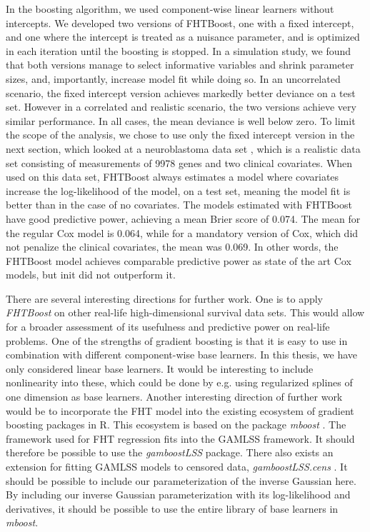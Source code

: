 In the boosting algorithm, we used component-wise linear learners without intercepts.
We developed two versions of FHTBoost, one with a fixed intercept, and one where the intercept is treated as a nuisance parameter, and is optimized in each iteration until the boosting is stopped.
In a simulation study, we found that both versions manage to select informative variables and shrink parameter sizes, and, importantly, increase model fit while doing so.
In an uncorrelated scenario, the fixed intercept version achieves markedly better deviance on a test set.
However in a correlated and realistic scenario, the two versions achieve very similar performance.
In all cases, the mean deviance is well below zero.
To limit the scope of the analysis, we chose to use only the fixed intercept version in the next section, which looked at a neuroblastoma data set \citep{oberthuer-data}, which is a realistic data set consisting of measurements of 9978 genes and two clinical covariates.
When used on this data set, FHTBoost always estimates a model where covariates increase the log-likelihood of the model, on a test set, meaning the model fit is better than in the case of no covariates.
The models estimated with FHTBoost have good predictive power, achieving a mean Brier score of 0.074.
The mean for the regular Cox model is 0.064, while for a mandatory version of Cox, which did not penalize the clinical covariates, the mean was 0.069.
In other words, the FHTBoost model achieves comparable predictive power as state of the art Cox models, but init did not outperform it.

There are several interesting directions for further work.
One is to apply \textit{FHTBoost} on other real-life high-dimensional survival data sets.
This would allow for a broader assessment of its usefulness and predictive power on real-life problems.
One of the strengths of gradient boosting is that it is easy to use in combination with different component-wise base learners.
In this thesis, we have only considered linear base learners.
It would be interesting to include nonlinearity into these, which could be done by e.g. using regularized splines of one dimension as base learners.
Another interesting direction of further work would be to incorporate the FHT model into the existing ecosystem of gradient boosting packages in R.
This ecosystem is based on the package \textit{mboost} \citep{mboost}.
The framework used for FHT regression fits into the GAMLSS framework.
It should therefore be possible to use the \textit{gamboostLSS} \citep{gamboostlss-paper, gamboostLSS-manual} package.
There also exists an extension for fitting GAMLSS models to censored data, \textit{gamboostLSS.cens} \citep{gamlsscens}.
It should be possible to include our parameterization of the inverse Gaussian here.
By including our inverse Gaussian parameterization with its log-likelihood and derivatives, it should be possible to use the entire library of base learners in \textit{mboost}.
